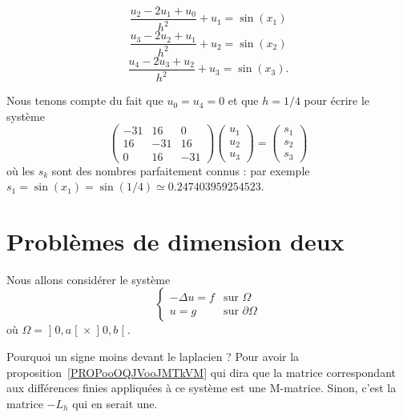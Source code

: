 	\begin{subproof}
		\spitem[Pour \( x_1\)]
		\begin{equation}
			\frac{ u_2-2u_1+u_0 }{ h^2 }+u_1=\sin(x_1)
		\end{equation}
		\spitem[Pour \( x_2\)]
		\begin{equation}
			\frac{ u_3-2u_2+u_1 }{ h^2 }+u_2=\sin(x_2)
		\end{equation}
		\spitem[Pour \( x_3\)]
		\begin{equation}
			\frac{ u_4-2u_3+u_2 }{ h^2 }+u_3=\sin(x_3).
		\end{equation}
	\end{subproof}
	Nous tenons compte du fait que \( u_0=u_4=0\) et que \( h=1/4\) pour écrire le système
	\begin{equation}
		\begin{pmatrix}
			-31 & 16  & 0   \\
			16  & -31 & 16  \\
			0   & 16  & -31
		\end{pmatrix}\begin{pmatrix}
			u_1 \\
			u_2 \\
			u_3
		\end{pmatrix}=\begin{pmatrix}
			s_1 \\
			s_2 \\
			s_3
		\end{pmatrix}
	\end{equation}
	où les \( s_k\) sont des nombres parfaitement connus : par exemple \( s_1=\sin(x_1)=\sin(1/4)\simeq 0.247403959254523\).

	\section{Problèmes de dimension deux}

	Nous allons considérer le système
	\begin{equation}                \label{SYSooTANLooRgnIMp}
		\begin{cases}
			-\Delta u=f & \text{sur } \Omega         \\
			u=g         & \text{sur } \partial\Omega
		\end{cases}
	\end{equation}
	où \( \Omega=\mathopen] 0 , a \mathclose[\times \mathopen] 0 , b \mathclose[\).

\begin{remark}
	Pourquoi un signe moins devant le laplacien ? Pour avoir la proposition~\ref{PROPooOQJVooJMTkVM} qui dira que la matrice correspondant aux différences finies appliquées à ce système est une M-matrice. Sinon, c'est la matrice \(-L_h\) qui en serait une.
\end{remark}
